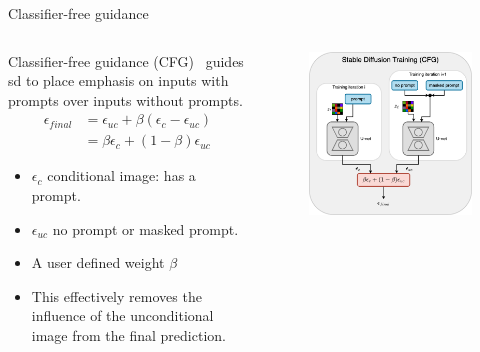 \documentclass[8pt]{beamer}
\begin{document}
\begin{frame}{Classifier-free guidance}
    \fontsize{7pt}{7pt}\selectfont
    \begin{columns}
        \begin{column}{.5\textwidth}
            Classifier-free guidance (CFG)~\cite{ho2022classifierfree} guides sd to place emphasis on inputs with prompts over inputs without prompts.
            \begin{align*}
                \epsilon_{final} &= \epsilon_{uc} + \beta(\epsilon_c - \epsilon_{uc}) \\
                &= \beta\epsilon_{c} + (1 - \beta)\epsilon_{uc}
            \end{align*}
            \begin{itemize}
                \item $\epsilon_c$ conditional image: has a prompt.
                \item $\epsilon_{uc}$ no prompt or masked prompt.
                \item A user defined weight $\beta$
                \item This effectively removes the influence of the unconditional image from the final prediction.
            \end{itemize}
        \end{column}
        \begin{column}{.5\textwidth}
           \begin{figure}
               \includegraphics[scale=0.23]{images/sd_cfg}
               \label{fig:diffusion_process_diagram}
           \end{figure}
        \end{column}
    \end{columns}
\end{frame}
\end{document}
